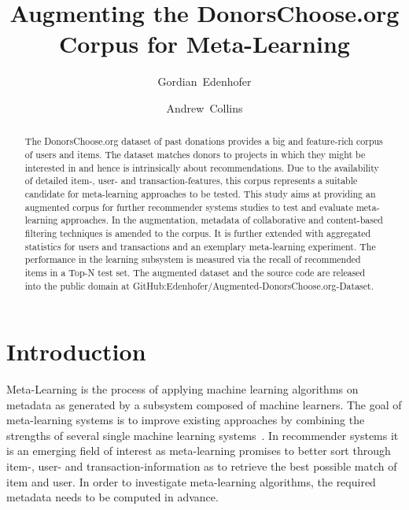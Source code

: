 \documentclass[runningheads]{llncs}
\begin{document}
\title{Augmenting the DonorsChoose.org Corpus for Meta-Learning}
\author{Gordian~Edenhofer \and Andrew~Collins}

\maketitle  %
\markboth{}{}  %

\begin{abstract}
The DonorsChoose.org dataset of past donations provides a big and feature-rich corpus of users and items. The dataset matches donors to projects in which they might be interested in and hence is intrinsically about recommendations. Due to the availability of detailed item-, user- and transaction-features, this corpus represents a suitable candidate for meta-learning approaches to be tested. This study aims at providing an augmented corpus for further recommender systems studies to test and evaluate meta-learning approaches. In the augmentation, metadata of collaborative and content-based filtering techniques is amended to the corpus. It is further extended with aggregated statistics for users and transactions and an exemplary meta-learning experiment. The performance in the learning subsystem is measured via the recall of recommended items in a Top-N test set. The augmented dataset and the source code are released into the public domain at GitHub:Edenhofer/Augmented-DonorsChoose.org-Dataset.

\end{abstract}

\section{Introduction}
Meta-Learning is the process of applying machine learning algorithms on metadata as generated by a subsystem composed of machine learners. The goal of meta-learning systems is to improve existing approaches by combining the strengths of several single machine learning systems~\cite{AIR:MetalearningSurveyOfTrendsAndTechnologiesLemke2015}. In recommender systems it is an emerging field of interest as meta-learning promises to better sort through item-, user- and transaction-information as to retrieve the best possible match of item and user. In order to investigate meta-learning algorithms, the required metadata needs to be computed in advance.
\end{document}
